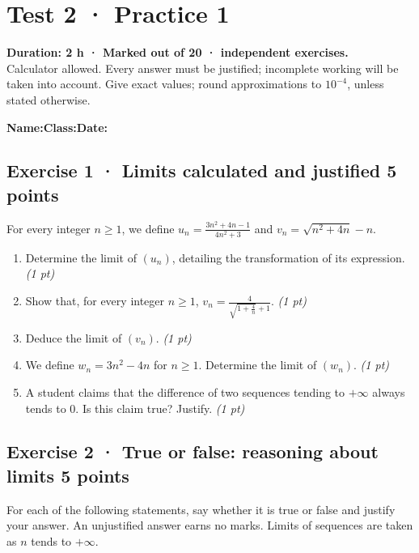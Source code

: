 \mxnewpage{}\label{sujet:2-1}

\section*{Test 2 · Practice 1}


\textbf{Duration: 2 h · Marked out of 20 ·  independent exercises.}\\Calculator allowed. Every answer must be justified; incomplete working will be taken into account. Give exact values; round approximations to $10^{-4}$, unless stated otherwise.

\smallskip\textbf{Name:}\enspace\dotfill\quad\textbf{Class:}\enspace\dotfill\quad\textbf{Date:}\enspace\dotfill

\subsection*{Exercise 1 · Limits calculated and justified \hfill 5 points}For every integer $n\ge1$, we define $u_n=\frac{3n^2+4n-1}{4n^2+3}$ and $v_n=\sqrt{n^2+4n}-n$.

\begin{enumerate}

\item Determine the limit of $(u_n)$, detailing the transformation of its expression. \hfill\textit{(1 pt)}

\item Show that, for every integer $n\ge1$, $v_n=\frac{4}{\sqrt{1+\frac{4}n}+1}$. \hfill\textit{(1 pt)}

\item Deduce the limit of $(v_n)$. \hfill\textit{(1 pt)}

\item We define $w_n=3n^2-4n$ for $n\ge1$. Determine the limit of $(w_n)$. \hfill\textit{(1 pt)}

\item A student claims that the difference of two sequences tending to $+\infty$ always tends to $0$. Is this claim true? Justify. \hfill\textit{(1 pt)}

\end{enumerate}

\subsection*{Exercise 2 · True or false: reasoning about limits \hfill 5 points}For each of the following statements, say whether it is true or false and justify your answer. An unjustified answer earns no marks. Limits of sequences are taken as $n$ tends to $+\infty$.

